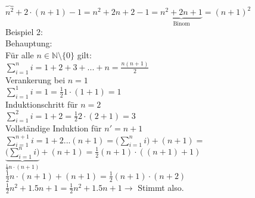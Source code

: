 \documentclass[a4paper]{scrartcl}
\begin{document}
$\overbrace{n^2} + 2 \cdot (n+1) - 1 = n^2 +2n + 2 -1 = \underbrace{n^2 +2n + 1}_{\text{Binom}} = (n+1)^2$ \\
\newpage
Beispiel 2: \\
Behauptung: \\
Für alle $ n \in \mathbb{N} \setminus \{0\}$ gilt: \\  \newline
$\sum\limits_{i=1}^n i = 1 + 2 + 3 + ... + n = \frac{n (n+1)}{2} $ \\  \newline
Verankerung bei $n=1$ \\  \newline
$\sum\limits_{i=1}^1 i = 1 = \frac{1}{2} 1 \cdot (1+1) = 1$  \\  \newline
Induktionschritt für $n=2$ \\  \newline
$\sum\limits_{i=1}^2 i = 1 + 2 = \frac{1}{2} 2 \cdot (2+1) = 3$  \\  \newline
Vollständige Induktion für $n' = n+1$ \\  \newline
$\sum\limits_{i=1}^{n+1} i = 1 + 2 ... (n+1) = \big(\sum\limits_{i=1}^n i\big) + (n+1) = $\\  \newline
$\underbrace{\big(\sum\limits_{i=1}^n i\big)}_{\frac{1}{2} n \cdot (n+1)} + (n+1) = \frac{1}{2} (n+1) \cdot ((n+1)+1) $ \\  \newline
$\frac{1}{2} n \cdot (n+1)+ (n+1) = \frac{1}{2} (n+1) \cdot (n+2) $ \\  \newline
$\frac{1}{2} n^2 + 1.5 n +1 = \frac{1}{2}n^2 + 1.5n + 1 \rightarrow$ Stimmt also. \\
\end{document}

